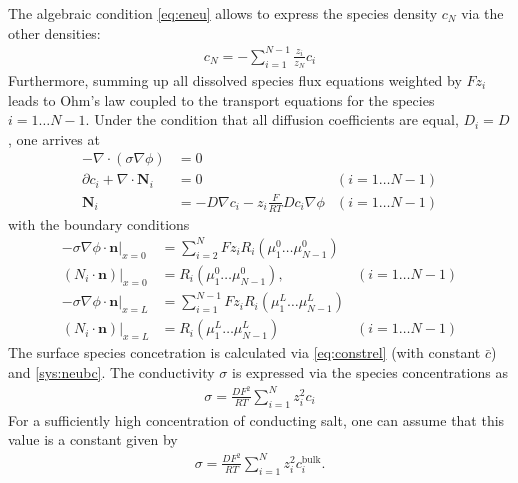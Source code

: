 \documentclass[12pt,oneside,reqno]{amsart}
\numberwithin{equation}{section}
\begin{document}
The algebraic condition \ref{eq:eneu} allows to express the species density $c_{N}$ 
via the other densities:
\begin{align}
  c_N=-\sum_{i=1}^{N-1} \frac{z_i}{z_N} c_i
\end{align}
Furthermore, summing up all dissolved species flux equations weighted by $Fz_i$ leads to Ohm's law
coupled to the transport equations for the species $i=1\dots N-1$. Under the condition that all
diffusion coefficients are equal, $D_i=D$, one arrives at
\begin{subequations}\label{sys:ONP}
\begin{align}
  -\nabla\cdot (\sigma\nabla\phi) &= 0\\
  \partial c_i  + \nabla \cdot \mathbf N_i  &=0 & (i=1\dots N-1)\\
  \mathbf N_i &= -D \nabla c_i  - z_i \frac{F}{RT}  D c_i \nabla \phi \label{eq:xddflux} & (i=1\dots N-1)
\end{align}
\end{subequations}
with the boundary conditions
\begin{subequations}\label{ONPbc}
\begin{align}
  -\sigma\nabla\phi \cdot \mathbf n|_{x=0} &= \sum_{i=2}^N Fz_iR_i(\mu_1^0\dots\mu_{N-1}^0)\\
  (N_i\cdot \mathbf n)|_{x=0}&=R_i(\mu_1^0\dots\mu_{N-1}^0), & (i=1\dots N-1)\\
  -\sigma\nabla\phi \cdot \mathbf n|_{x=L} &= \sum_{i=1}^{N-1} Fz_iR_i(\mu_1^L\dots\mu_{N-1}^L)\\
  (N_i\cdot \mathbf n)|_{x=L} &=R_i(\mu_1^L\dots\mu_{N-1}^L) & (i=1\dots N-1)
\end{align}
\end{subequations}
The surface species concetration is calculated via \eqref{eq:constrel} (with constant $\bar c$) and
  \eqref{sys:neubc}.
The  conductivity $\sigma$ is expressed via the species concentrations as
\begin{align}
  \sigma= \frac{DF^2}{RT}\sum_{i=1}^N z_i^2 c_i
\end{align}
For a sufficiently high concentration of conducting salt, one can assume that this value
is a constant given by 
\begin{align}
  \sigma= \frac{DF^2}{RT}\sum_{i=1}^N z_i^2 c_i^{\text{bulk}}.
\end{align}
\end{document}
